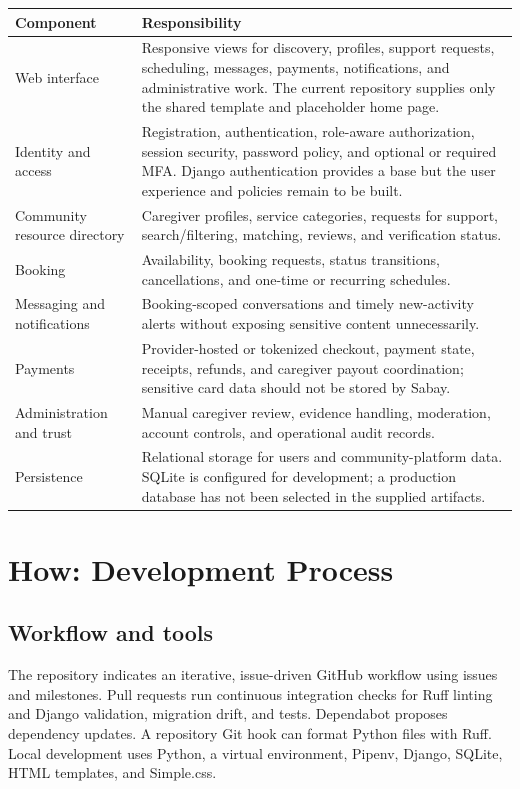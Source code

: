\documentclass[11pt]{article}
\begin{document}
\begin{tabularx}{\textwidth}{p{}X}
\toprule
\textbf{Component} & \textbf{Responsibility} \\
\midrule
Web interface & Responsive views for discovery, profiles, support requests, scheduling, messages, payments, notifications, and administrative work. The current repository supplies only the shared template and placeholder home page. \\
Identity and access & Registration, authentication, role-aware authorization, session security, password policy, and optional or required MFA. Django authentication provides a base but the user experience and policies remain to be built. \\
Community resource directory & Caregiver profiles, service categories, requests for support, search/filtering, matching, reviews, and verification status. \\
Booking & Availability, booking requests, status transitions, cancellations, and one-time or recurring schedules. \\
Messaging and notifications & Booking-scoped conversations and timely new-activity alerts without exposing sensitive content unnecessarily. \\
Payments & Provider-hosted or tokenized checkout, payment state, receipts, refunds, and caregiver payout coordination; sensitive card data should not be stored by Sabay. \\
Administration and trust & Manual caregiver review, evidence handling, moderation, account controls, and operational audit records. \\
Persistence & Relational storage for users and community-platform data. SQLite is configured for development; a production database has not been selected in the supplied artifacts. \\
\bottomrule
\end{tabularx}

\section{How: Development Process}

\subsection{Workflow and tools}

The repository indicates an iterative, issue-driven GitHub workflow using issues and milestones. Pull requests run continuous integration checks for Ruff linting and Django validation, migration drift, and tests. Dependabot proposes dependency updates. A repository Git hook can format Python files with Ruff. Local development uses Python, a virtual environment, Pipenv, Django, SQLite, HTML templates, and Simple.css.
\end{document}
